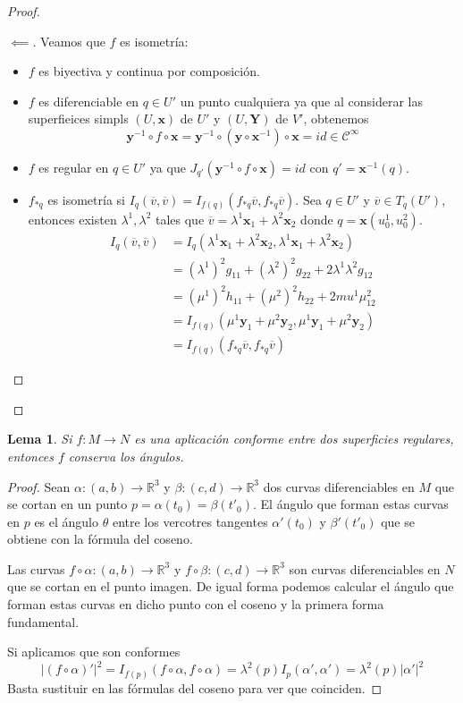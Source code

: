 \documentclass[a4paper,10pt]{book}
\newtheorem{lem}[thm]{Lema}
\newcommand{\UX}{(U,\textbf{x})}
\newenvironment{subproof}[1][\proofname]{%
	\renewcommand{\qedsymbol}{$\blacksquare$}%
	\begin{proof}[#1]%
	}{%
	\end{proof}%
}
\begin{document}
\begin{proof}
\begin{subproof}[$\impliedby$]
Veamos que $f$ es isometría:
\begin{itemize}
\item $f$ es biyectiva y continua por composición.
\item $f$ es diferenciable en $q\in U'$ un punto cualquiera ya que al considerar las superfieices simpls $\UX$ de $U'$ y $(U,\mathbf{Y})$ de $V'$, obtenemos
\[
\mathbf{y}^{-1}\circ f\circ \mathbf{x} =\mathbf{y}^{-1} \circ (\mathbf{y}\circ \mathbf{x}^{-1})\circ \mathbf{x}=id\in\mathcal{C}^\infty
\]
\item $f$ es regular en $q\in U'$ ya que $J_{q'}(\mathbf{y}^{-1}\circ f\circ \mathbf{x})=id$ con $q'=\mathbf{x}^{-1}(q)$.
\item $f_{*q}$ es isometría si $I_q(\overline{v},\overline{v})=I_{f(q)}(f_{*q}\overline{v},f_{*q}\overline{v})$. Sea $q\in U'$ y $\overline{v}\in T_q(U')$, entonces existen $\lambda^1,\lambda^2$ tales que $\overline{v}=\lambda^1\mathbf{x}_1+\lambda^2\mathbf{x}_2$ donde $q=\mathbf{x}(u_0^1,u_0^2)$.\\
\begin{align*}
I_q(\overline{v},\overline{v})&=I_q(\lambda^1\mathbf{x}_1+\lambda^2\mathbf{x}_2,\lambda^1\mathbf{x}_1+\lambda^2\mathbf{x}_2)\\
&=(\lambda^1)^2g_{11}+(\lambda^2)^2g_{22}+2\lambda^1\lambda^2g_{12}\\
&=(\mu^1)^2h_{11}+(\mu^2)^2h_{22}+2mu^1\mu^2_{12}\\
&=I_{f(q)}(\mu^1\mathbf{y}_1+\mu^2\mathbf{y}_2,\mu^1\mathbf{y}_1+\mu^2\mathbf{y}_2)\\
&=I_{f(q)}(f_{*q}\overline{v},f_{*q}\overline{v})
\end{align*}
\end{itemize}
\end{subproof}
\end{proof}

\begin{lem}
Si $f:M\to N$ es una aplicación conforme entre dos superficies regulares, entonces $f$ conserva los ángulos.
\end{lem}
\begin{proof}
Sean $\alpha:(a,b)\to \mathbb{R}^3$ y $\beta:(c,d)\to \mathbb{R}^3$ dos curvas diferenciables en $M$ que se cortan en un punto $p=\alpha(t_0)=\beta(t'_0)$. El ángulo que forman estas curvas en $p$ es el ángulo $\theta$ entre los vercotres tangentes $\alpha'(t_0)$ y $\beta'(t'_0)$ que se obtiene con la fórmula del coseno.

Las curvas $f\circ \alpha:(a,b)\to \mathbb{R}^3$ y $f\circ \beta:(c,d)\to \mathbb{R}^3$ son curvas diferenciables en $N$ que se cortan en el punto imagen. De igual forma podemos calcular el ángulo que forman estas curvas en dicho punto con el coseno y la primera forma fundamental.

Si aplicamos que son conformes
\[
|(f\circ \alpha)'|^2=I_{f(p)}(f\circ \alpha,f\circ \alpha)=\lambda^2(p)I_p(\alpha',\alpha')=\lambda^2(p)|\alpha'|^2
\]
Basta sustituir en las fórmulas del coseno para ver que coinciden.
\end{proof}
\end{document}
